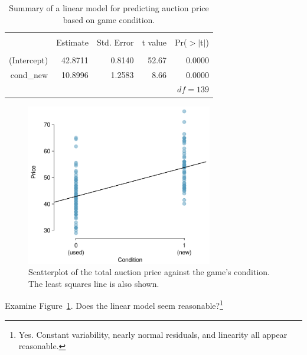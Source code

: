 \begin{table}[ht]
\centering
\begin{tabular}{rrrrr}
  \hline
  \vspace{-3.7mm} & & & & \\
 & Estimate & Std. Error & t value & Pr($>$$|$t$|$) \\ 
  \hline
  \vspace{-3.8mm} & & & & \\
(Intercept) & 42.8711 & 0.8140 & 52.67 & 0.0000 \\ 
  cond\_\hspace{0.3mm}new & 10.8996 & 1.2583 & 8.66 & 0.0000 \\ 
   \hline
   &&&\multicolumn{2}{r}{$df=139$}
\end{tabular}
\caption{Summary of a linear model for predicting auction price based on game condition.}
\label{singleVarModelsForPriceUsingCond}
\end{table}

\begin{figure}
\centering
\includegraphics[width=0.725\textwidth]{ch_regr_mult_and_log/figures/marioKartSingle/marioKartSingle}
\caption{Scatterplot of the total auction price against the game's condition. The least squares line is also shown.}
\label{marioKartSingle}
\end{figure}

\begin{exercise}
Examine Figure~\ref{marioKartSingle}. Does the linear model seem reasonable?\footnote{Yes. Constant variability, nearly normal residuals, and linearity all appear reasonable.}
\end{exercise}

